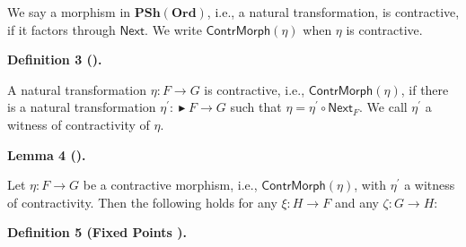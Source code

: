 \documentclass[10pt,a4paper]{article}
\begin{document}
 
 
We say a morphism in $\mathbf{PSh}(\mathbf{Ord})$, i.e., a natural transformation, is contractive, if it factors through $\mathsf{Next}{}$. We write $\mathsf{ContrMorph}(\eta)$ when $\eta$ is contractive.\par
 
 
 
\par\medskip\noindent\textbf{Definition 3 ().}\par
 
 
A natural transformation $\eta:F\to G$ is contractive, i.e., $\mathsf{ContrMorph}(\eta)$, if there is a natural transformation $\eta^{\prime}:\mathop{\blacktriangleright}F\to G$ such that $\eta=\eta^{\prime}\circ\mathsf{Next}_{F}$. We call $\eta^{\prime}$ a witness of contractivity of $\eta$.\par
 
 
 
 
\par\medskip\noindent\textbf{Lemma 4 ().}\par
 
 
Let $\eta:F\to G$ be a contractive morphism, i.e., $\mathsf{ContrMorph}(\eta)$, with $\eta^{\prime}$ a witness of contractivity. Then the following holds for any $\xi:H\to F$ and any $\zeta:G\to H$:\par
 
\begin{center}\end{center}
 
 
 
 
\par\medskip\noindent\textbf{Definition 5 (Fixed Points ).}\par
 
\end{document}
